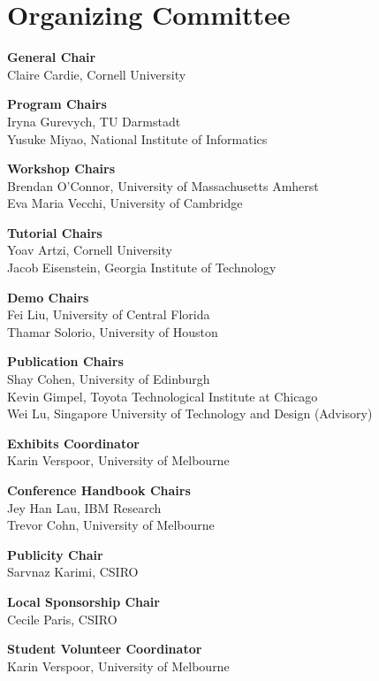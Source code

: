 \markboth{}{} %
\markright{}{} %

\section{Organizing Committee}{}

\setlength{\parindent}{0pt}

{\bf General Chair} \\
Claire Cardie, Cornell University

{\bf Program Chairs} \\
Iryna Gurevych, TU Darmstadt\\
Yusuke Miyao, National Institute of Informatics

{\bf Workshop Chairs} \\
Brendan O’Connor, University of Massachusetts Amherst\\
Eva Maria Vecchi, University of Cambridge

{\bf Tutorial Chairs} \\
Yoav Artzi, Cornell University\\
Jacob Eisenstein, Georgia Institute of Technology

{\bf Demo Chairs} \\
Fei Liu, University of Central Florida\\
Thamar Solorio, University of Houston

{\bf Publication Chairs} \\
Shay Cohen, University of Edinburgh\\
Kevin Gimpel, Toyota Technological Institute at Chicago\\
Wei Lu, Singapore University of Technology and Design (Advisory)

{\bf Exhibits Coordinator} \\
Karin Verspoor, University of Melbourne

{\bf Conference Handbook Chairs} \\
Jey Han Lau, IBM Research\\
Trevor Cohn, University of Melbourne

{\bf Publicity Chair} \\
Sarvnaz Karimi, CSIRO

{\bf Local Sponsorship Chair} \\
Cecile Paris, CSIRO

{\bf Student Volunteer Coordinator} \\
Karin Verspoor, University of Melbourne

